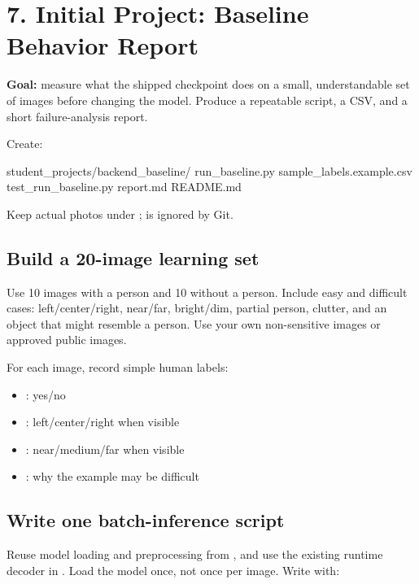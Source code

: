 \documentclass[11pt]{article}
\begin{document}
\section{7. Initial Project: Baseline Behavior Report}

\begin{greenbox}
\textbf{Goal:} measure what the shipped checkpoint does on a small, understandable set of images before changing the model. Produce a repeatable script, a CSV, and a short failure-analysis report.
\end{greenbox}

Create:

\begin{Code}
student_projects/backend_baseline/
  run_baseline.py
  sample_labels.example.csv
  test_run_baseline.py
  report.md
  README.md
\end{Code}

Keep actual photos under ;  is ignored by Git.

\subsection{Build a 20-image learning set}

Use 10 images with a person and 10 without a person. Include easy and difficult cases: left/center/right, near/far, bright/dim, partial person, clutter, and an object that might resemble a person. Use your own non-sensitive images or approved public images.

For each image, record simple human labels:

\begin{itemize}
\item {}: yes/no
\item {}: left/center/right when visible
\item {}: near/medium/far when visible
\item {}: why the example may be difficult
\end{itemize}

\subsection{Write one batch-inference script}

Reuse model loading and preprocessing from , and use the existing runtime decoder in . Load the model once, not once per image. Write  with:
\end{document}
